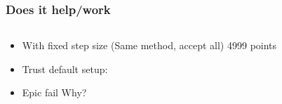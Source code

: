 \documentclass{beamer}
\begin{document}
\begin{frame}
\frametitle{Does it help/work}
\begin{columns}
\begin{column}{0.5\linewidth}
\begin{itemize}
\item<1-> With fixed step size (Same method, accept all) 4999 points

\item<2-> Trust default setup:

\item<2-> Epic fail Why?


\end{itemize}
\end{column}
\begin{column}{0.5\linewidth}
\end{column}
\end{columns}
\end{frame}
\end{document}
